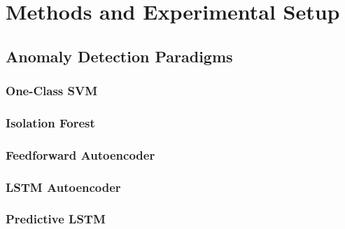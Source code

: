 \chapter{Methods and Experimental Setup}
\label{ch:methodology}


\section{Anomaly Detection Paradigms}

\subsection{One-Class SVM}

\subsection{Isolation Forest}

\subsection{Feedforward Autoencoder}

\subsection{LSTM Autoencoder}

\subsection{Predictive LSTM}


